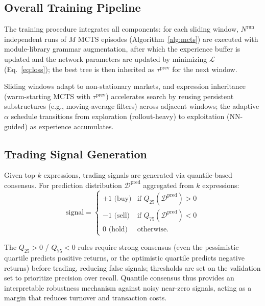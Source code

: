\subsection{Overall Training Pipeline}
\label{subsec:pipeline}

The training procedure integrates all components: for each sliding window, $N^{\text{run}}$ independent runs of $M$ MCTS episodes (Algorithm~\ref{alg:mcts}) are executed with module-library grammar augmentation, after which the experience buffer is updated and the network parameters are updated by minimizing $\mathcal{L}$ (Eq.~\ref{eq:loss}); the best tree is then inherited as $\tau^{\text{prev}}$ for the next window.

Sliding windows adapt to non-stationary markets, and expression inheritance (warm-starting MCTS with $\tau^{\text{prev}}$) accelerates search by reusing persistent substructures (e.g., moving-average filters) across adjacent windows; the adaptive $\alpha$ schedule transitions from exploration (rollout-heavy) to exploitation (NN-guided) as experience accumulates.
\subsection{Trading Signal Generation}
\label{subsec:signal}

Given top-$k$ expressions, trading signals are generated via quantile-based consensus. For prediction distribution $\mathcal{D}^{\text{pred}}$ aggregated from $k$ expressions:
\begin{equation}
\text{signal} = \begin{cases}
+1 \text{ (buy)} & \text{if } Q_{25}(\mathcal{D}^{\text{pred}}) > 0 \\
-1 \text{ (sell)} & \text{if } Q_{75}(\mathcal{D}^{\text{pred}}) < 0 \\
0 \text{ (hold)} & \text{otherwise}.
\end{cases}
\label{eq:signal}
\end{equation}

The $Q_{25} > 0$ / $Q_{75} < 0$ rules require strong consensus (even the pessimistic quartile predicts positive returns, or the optimistic quartile predicts negative returns) before trading, reducing false signals; thresholds are set on the validation set to prioritize precision over recall. Quantile consensus thus provides an interpretable robustness mechanism against noisy near-zero signals, acting as a margin that reduces turnover and transaction costs.

